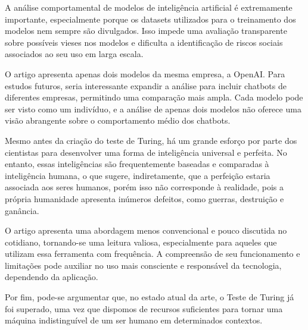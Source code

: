 \documentclass[a4paper,12pt]{article}
\begin{document}
	A análise comportamental de modelos de inteligência artificial é extremamente importante, especialmente porque os datasets utilizados para o treinamento dos modelos nem sempre são divulgados. Isso impede uma avaliação transparente sobre possíveis vieses nos modelos e dificulta a identificação de riscos sociais associados ao seu uso em larga escala.
	
	O artigo apresenta apenas dois modelos da mesma empresa, a OpenAI. Para estudos futuros, seria interessante expandir a análise para incluir chatbots de diferentes empresas, permitindo uma comparação mais ampla. Cada modelo pode ser visto como um indivíduo, e a análise de apenas dois modelos não oferece uma visão abrangente sobre o comportamento médio dos chatbots.
	
	Mesmo antes da criação do teste de Turing, há um grande esforço por parte dos cientistas para desenvolver uma forma de inteligência universal e perfeita. No entanto, essas inteligências são frequentemente baseadas e comparadas à inteligência humana, o que sugere, indiretamente, que a perfeição estaria associada aos seres humanos, porém isso não corresponde à realidade, pois a própria humanidade apresenta inúmeros defeitos, como guerras, destruição e ganância.
	
	
	O artigo apresenta uma abordagem menos convencional e pouco discutida no cotidiano, tornando-se uma leitura valiosa, especialmente para aqueles que utilizam essa ferramenta com frequência. A compreensão de seu funcionamento e limitações pode auxiliar no uso mais consciente e responsável da tecnologia, dependendo da aplicação. 
	
	Por fim, pode-se argumentar que, no estado atual da arte, o Teste de Turing já foi superado, uma vez que dispomos de recursos suficientes para tornar uma máquina indistinguível de um ser humano em determinados contextos.
	
	
	
	\begin{center}
	\end{center}
	
	
	\begingroup
	\renewcommand{\section}[2]{}%
	
	\endgroup
	
\end{document}

